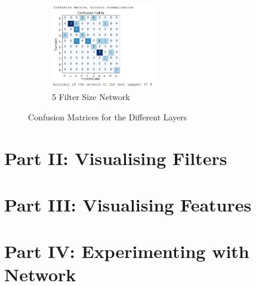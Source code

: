 \documentclass{report}
\begin{document}
\begin{figure}[h!]
\begin{subfigure}[t]{0.45\textwidth}
            \centering
            \includegraphics[width=0.5\textwidth]{5_ks}
            \caption{5 Filter Size Network}
        \end{subfigure}
        \caption{Confusion Matrices for the Different Layers}
    \end{figure}


    \section{Part II: Visualising Filters}

    \section{Part III: Visualising Features}

    \section{Part IV: Experimenting with Network}
\end{document}
